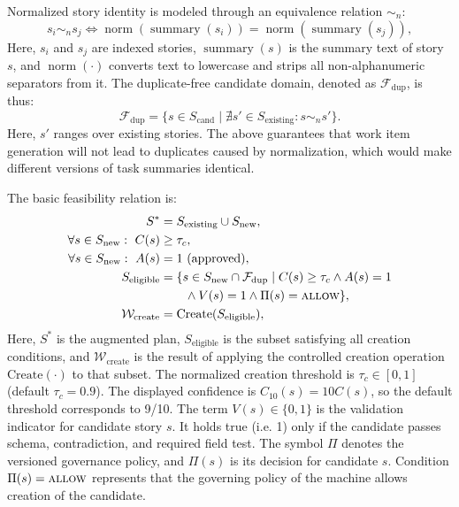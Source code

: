 \documentclass[pdflatex,sn-basic]{sn-jnl}
\begin{document}
Normalized story identity is modeled through an equivalence relation $\sim_n$:
\begin{equation}
s_i \sim_n s_j \iff \operatorname{norm}(\operatorname{summary}(s_i)) =
\operatorname{norm}(\operatorname{summary}(s_j)),
\end{equation}
Here, $s_i$ and $s_j$ are indexed stories, $\operatorname{summary}(s)$ is the summary text of story $s$, and $\operatorname{norm}(\cdot)$ converts text to lowercase and strips all non-alphanumeric separators from it. The duplicate-free candidate domain, denoted as $\mathcal{F}_{\mathrm{dup}}$, is thus:
\begin{equation}
\mathcal{F}_{\mathrm{dup}}=\{s\in S_{\text{cand}}\mid \nexists s'\in S_{\text{existing}}: s\sim_n s'\}.
\end{equation}
Here, $s'$ ranges over existing stories. The above guarantees that work item generation will not lead to duplicates caused by normalization, which would make different versions of task summaries identical.

The basic feasibility relation is:
\begin{align}
S^* &= S_{\text{existing}} \cup S_{\text{new}}, \\
\forall s \in S_{\text{new}}:~ C(s) &\geq \tau_c, \\
\forall s \in S_{\text{new}}:~ A(s) &= 1 \text{ (approved)}, \\
S_{\text{eligible}} &= \{ s \in S_{\text{new}}\cap\mathcal{F}_{\mathrm{dup}} \mid C(s)\ge \tau_c \land A(s)=1
\nonumber\\ &\qquad {}\land V(s)=1 \land \Pi(s)=\textsc{allow} \}, \\
\mathcal{W}_{\text{create}} &= \text{Create}(S_{\text{eligible}}),
\end{align}
Here, $S^*$ is the augmented plan, $S_{\text{eligible}}$ is the subset satisfying all creation conditions, and $\mathcal{W}_{\text{create}}$ is the result of applying the controlled creation operation $\text{Create}(\cdot)$ to that subset. The normalized creation threshold is $\tau_c\in[0,1]$ (default $\tau_c=0.9$). The displayed confidence is $C_{10}(s)=10C(s)$, so the default threshold corresponds to 9/10. The term
$V(s)\in\{0,1\}$ is the validation indicator for candidate story $s$.
It holds true (i.e. 1) only if the candidate passes schema, contradiction, and required field test. The symbol $\Pi$ denotes the versioned governance policy, and $\Pi(s)$ is its decision for candidate $s$. Condition $\Pi(s)=\textsc{allow}$ represents that the governing policy of the machine allows creation of the candidate.
\end{document}
